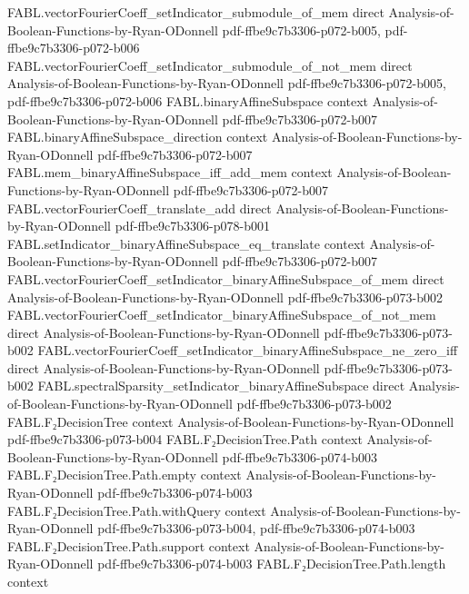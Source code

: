 \begin{theorem}
\proofstep
  {FABL.vectorFourierCoeff_setIndicator_submodule_of_mem}
  {direct}
  {Analysis-of-Boolean-Functions-by-Ryan-ODonnell}
  {pdf-ffbe9c7b3306-p072-b005,
    pdf-ffbe9c7b3306-p072-b006}
\proofstep
  {FABL.vectorFourierCoeff_setIndicator_submodule_of_not_mem}
  {direct}
  {Analysis-of-Boolean-Functions-by-Ryan-ODonnell}
  {pdf-ffbe9c7b3306-p072-b005,
    pdf-ffbe9c7b3306-p072-b006}
\proofstep
  {FABL.binaryAffineSubspace}
  {context}
  {Analysis-of-Boolean-Functions-by-Ryan-ODonnell}
  {pdf-ffbe9c7b3306-p072-b007}
\proofstep
  {FABL.binaryAffineSubspace_direction}
  {context}
  {Analysis-of-Boolean-Functions-by-Ryan-ODonnell}
  {pdf-ffbe9c7b3306-p072-b007}
\proofstep
  {FABL.mem_binaryAffineSubspace_iff_add_mem}
  {context}
  {Analysis-of-Boolean-Functions-by-Ryan-ODonnell}
  {pdf-ffbe9c7b3306-p072-b007}
\proofstep
  {FABL.vectorFourierCoeff_translate_add}
  {direct}
  {Analysis-of-Boolean-Functions-by-Ryan-ODonnell}
  {pdf-ffbe9c7b3306-p078-b001}
\proofstep
  {FABL.setIndicator_binaryAffineSubspace_eq_translate}
  {context}
  {Analysis-of-Boolean-Functions-by-Ryan-ODonnell}
  {pdf-ffbe9c7b3306-p072-b007}
\proofstep
  {FABL.vectorFourierCoeff_setIndicator_binaryAffineSubspace_of_mem}
  {direct}
  {Analysis-of-Boolean-Functions-by-Ryan-ODonnell}
  {pdf-ffbe9c7b3306-p073-b002}
\proofstep
  {FABL.vectorFourierCoeff_setIndicator_binaryAffineSubspace_of_not_mem}
  {direct}
  {Analysis-of-Boolean-Functions-by-Ryan-ODonnell}
  {pdf-ffbe9c7b3306-p073-b002}
\proofstep
  {FABL.vectorFourierCoeff_setIndicator_binaryAffineSubspace_ne_zero_iff}
  {direct}
  {Analysis-of-Boolean-Functions-by-Ryan-ODonnell}
  {pdf-ffbe9c7b3306-p073-b002}
\proofstep
  {FABL.spectralSparsity_setIndicator_binaryAffineSubspace}
  {direct}
  {Analysis-of-Boolean-Functions-by-Ryan-ODonnell}
  {pdf-ffbe9c7b3306-p073-b002}
\proofstep
  {FABL.F₂DecisionTree}
  {context}
  {Analysis-of-Boolean-Functions-by-Ryan-ODonnell}
  {pdf-ffbe9c7b3306-p073-b004}
\proofstep
  {FABL.F₂DecisionTree.Path}
  {context}
  {Analysis-of-Boolean-Functions-by-Ryan-ODonnell}
  {pdf-ffbe9c7b3306-p074-b003}
\proofstep
  {FABL.F₂DecisionTree.Path.empty}
  {context}
  {Analysis-of-Boolean-Functions-by-Ryan-ODonnell}
  {pdf-ffbe9c7b3306-p074-b003}
\proofstep
  {FABL.F₂DecisionTree.Path.withQuery}
  {context}
  {Analysis-of-Boolean-Functions-by-Ryan-ODonnell}
  {pdf-ffbe9c7b3306-p073-b004,
    pdf-ffbe9c7b3306-p074-b003}
\proofstep
  {FABL.F₂DecisionTree.Path.support}
  {context}
  {Analysis-of-Boolean-Functions-by-Ryan-ODonnell}
  {pdf-ffbe9c7b3306-p074-b003}
\proofstep
  {FABL.F₂DecisionTree.Path.length}
  {context}

\end{theorem}
